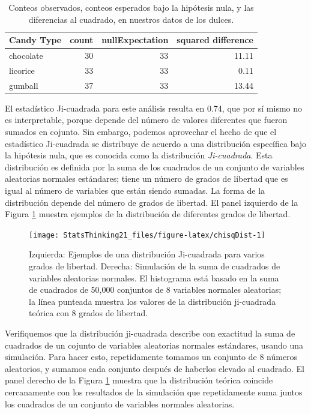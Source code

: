 \documentclass[
  12pt,
]{book}
\theoremstyle{definition}
\theoremstyle{definition}
\theoremstyle{definition}
\theoremstyle{remark}
\begin{document}
\begin{table}

\caption{\label{tab:candyDf}Conteos observados, conteos esperados bajo la hipótesis nula, y las diferencias al cuadrado, en nuestros datos de los dulces.}
\centering
\begin{tabular}[t]{l|r|r|r}
\hline
Candy Type & count & nullExpectation & squared difference\\
\hline
chocolate & 30 & 33 & 11.11\\
\hline
licorice & 33 & 33 & 0.11\\
\hline
gumball & 37 & 33 & 13.44\\
\hline
\end{tabular}
\end{table}

El estadístico Ji-cuadrada para este análisis resulta en 0.74, que por sí mismo no es interpretable, porque depende del número de valores diferentes que fueron sumados en cojunto. Sin embargo, podemos aprovechar el hecho de que el estadístico Ji-cuadrada se distribuye de acuerdo a una distribución específica bajo la hipótesis nula, que es conocida como la distribución \emph{Ji-cuadrada}. Esta distribución es definida por la suma de los cuadrados de un conjunto de variables aleatorias normales estándares; tiene un número de grados de libertad que es igual al número de variables que están siendo sumadas. La forma de la distribución depende del número de grados de libertad. El panel izquierdo de la Figura \ref{fig:chisqDist} muestra ejemplos de la distribución de diferentes grados de libertad.

\begin{figure}
\texttt{[image: StatsThinking21\_files/figure-latex/chisqDist-1]} \caption{Izquierda: Ejemplos de una distribución Ji-cuadrada para varios grados de libertad. Derecha: Simulación de la suma de cuadrados de variables aleatorias normales. El histograma está basado en la suma de cuadrados de 50,000 conjuntos de 8 variables normales aleatorias; la línea punteada muestra los valores de la distribución ji-cuadrada teórica con 8 grados de libertad.}\label{fig:chisqDist}
\end{figure}

Verifiquemos que la distribución ji-cuadrada describe con exactitud la suma de cuadrados de un cojunto de variables aleatorias normales estándares, usando una simulación. Para hacer esto, repetidamente tomamos un conjunto de 8 números aleatorios, y sumamos cada conjunto después de haberlos elevado al cuadrado. El panel derecho de la Figura \ref{fig:chisqDist} muestra que la distribución teórica coincide cercanamente con los resultados de la simulación que repetidamente suma juntos los cuadrados de un conjunto de variables normales aleatorias.
\end{document}

